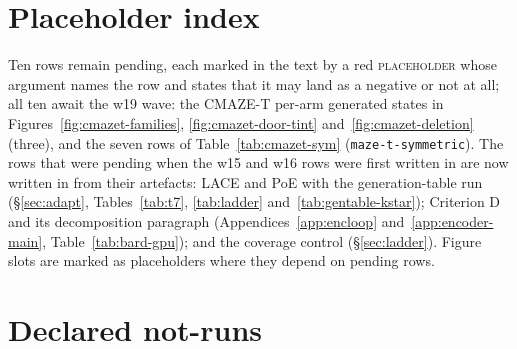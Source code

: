 \documentclass{article} %
\begin{document}
\section{Placeholder index}
\label{app:placeholders}

Ten rows remain pending, each marked in the text by a red \textsc{placeholder} whose argument names
the row and states that it may land as a negative or not at all; all ten await the w19 wave: the
CMAZE-T per-arm generated states in Figures~\ref{fig:cmazet-families}, \ref{fig:cmazet-door-tint}
and~\ref{fig:cmazet-deletion} (three), and the seven rows of Table~\ref{tab:cmazet-sym}
(\texttt{maze-t-symmetric}). The rows that were pending when the w15 and w16 rows were first
written in are now written in from their artefacts: LACE and PoE with the generation-table run
(\S\ref{sec:adapt}, Tables~\ref{tab:t7}, \ref{tab:ladder} and~\ref{tab:gentable-kstar});
Criterion D and its decomposition paragraph (Appendices~\ref{app:encloop}
and~\ref{app:encoder-main}, Table~\ref{tab:bard-gpu}); and the coverage control
(\S\ref{sec:ladder}). Figure slots are marked as placeholders where they depend on pending rows.

\section{Declared not-runs}
\label{app:notrun}
\end{document}
